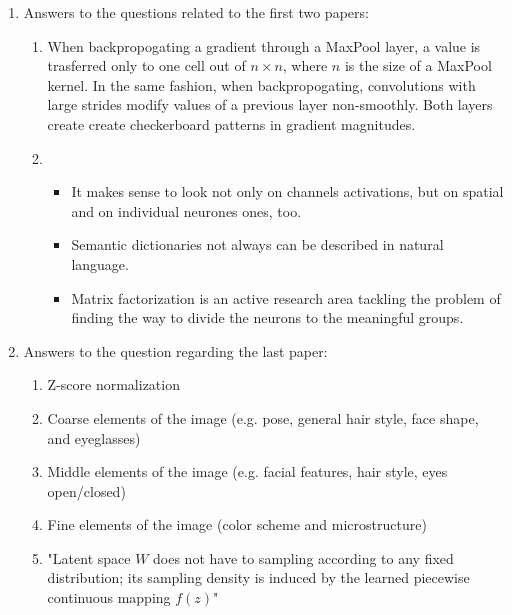 \documentclass{article}
\begin{document}
\begin{enumerate}
	\item Answers to the questions related to the first two papers: 
		\begin{enumerate}
			\item When backpropogating a gradient through a MaxPool layer, a value is trasferred only to one cell out of $n \times n$, where $n$ is the size of a MaxPool kernel. In the same fashion, when backpropogating, convolutions with large strides modify values of a previous layer non-smoothly. Both layers create create checkerboard patterns in gradient magnitudes.
			\item 
				\begin{itemize} 
					\item It makes sense to look not only on channels activations, but on spatial and on individual neurones ones, too.
					\item Semantic dictionaries not always can be described in natural language.
					\item Matrix factorization is an active research area tackling the problem of finding the way to divide the neurons to the meaningful groups.
				\end{itemize}
		\end{enumerate}
	\item Answers to the question regarding the last paper:
		\begin{enumerate}
			\item Z-score normalization
			\item Coarse elements of the image (e.g. pose, general hair style, face shape, and eyeglasses)
			\item Middle elements of the image (e.g. facial features, hair style, eyes open/closed)
			\item Fine elements of the image (color scheme and microstructure)
			\item "Latent space $W$ does not have to sampling according to any fixed distribution; its sampling density is induced by the learned piecewise continuous mapping $f(z)$"
		\end{enumerate}
\end{enumerate}
\end{document}
